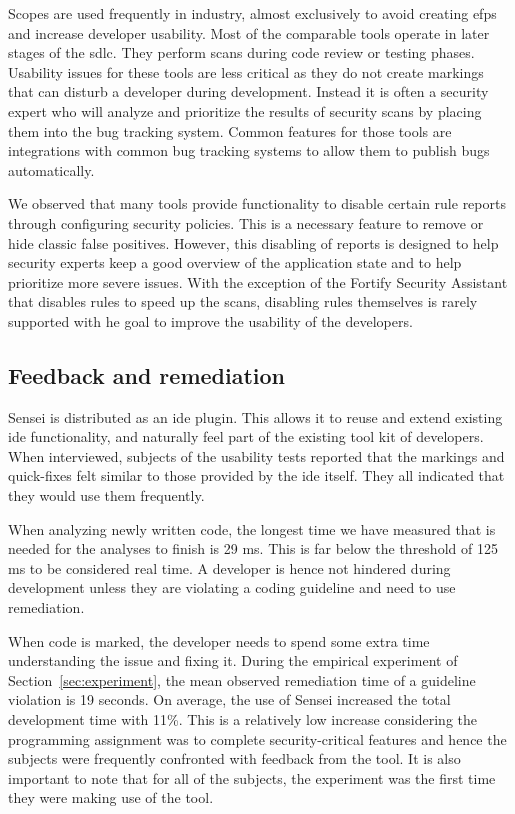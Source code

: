 Scopes are used frequently in industry, almost exclusively to avoid creating \glspl{efp} and increase developer usability.
Most of the comparable tools operate in later stages of the \gls{sdlc}.
They perform scans during code review or testing phases.
Usability issues for these tools are less critical as they do not create markings that can disturb a developer during development.
Instead it is often a security expert who will analyze and prioritize the results of security scans by placing them into the bug tracking system.
Common features for those tools are integrations with common bug tracking systems to allow them to publish bugs automatically.

We observed that many tools provide functionality to disable certain rule reports through configuring security policies.
This is a necessary feature to remove or hide classic false positives.
However, this disabling of reports is designed to help security experts keep a good overview of the application state and to help prioritize more severe issues.
With the exception of the Fortify Security Assistant that disables rules to speed up the scans, disabling rules themselves is rarely supported with he goal to improve the usability of the developers.

\subsection{Feedback and remediation}
Sensei is distributed as an \gls{ide} plugin.
This allows it to reuse and extend existing \gls{ide} functionality, and naturally feel part of the existing tool kit of developers.
When interviewed, subjects of the usability tests reported that the markings and quick-fixes felt similar to those provided by the \gls{ide} itself.
They all indicated that they would use them frequently.

When analyzing newly written code, the longest time we have measured that is needed for the analyses to finish is 29 ms.
This is far below the threshold of 125 ms to be considered real time.
A developer is hence not hindered during development unless they are violating a coding guideline and need to use remediation.

When code is marked, the developer needs to spend some extra time understanding the issue and fixing it.
During the empirical experiment of Section~\ref{sec:experiment}, the mean observed remediation time of a guideline violation is 19 seconds.
On average, the use of Sensei increased the total development time with 11\%.
This is a relatively low increase considering the programming assignment was to complete security-critical features and hence the subjects were frequently confronted with feedback from the tool.
It is also important to note that for all of the subjects, the experiment was the first time they were making use of the tool.

